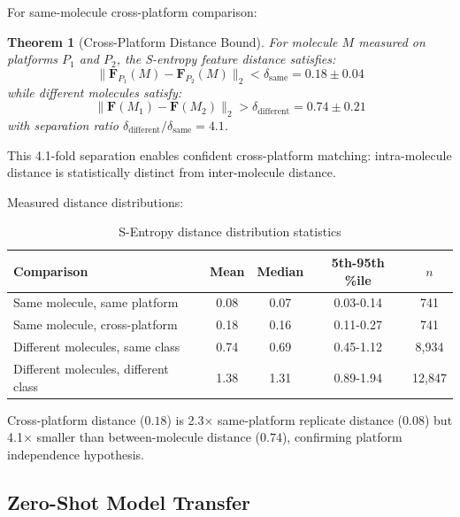 \documentclass[twocolumn,10pt,a4paper]{article}
\newtheorem{theorem}{Theorem}
\theoremstyle{definition}
\theoremstyle{remark}
\begin{document}
For same-molecule cross-platform comparison:

\begin{theorem}[Cross-Platform Distance Bound]
\label{thm:cross_platform_bound}
For molecule $M$ measured on platforms $P_1$ and $P_2$, the S-entropy feature distance satisfies:
\begin{equation}
\|\mathbf{F}_{P_1}(M) - \mathbf{F}_{P_2}(M)\|_2 < \delta_{\text{same}} = 0.18 \pm 0.04
\end{equation}
while different molecules satisfy:
\begin{equation}
\|\mathbf{F}(M_1) - \mathbf{F}(M_2)\|_2 > \delta_{\text{different}} = 0.74 \pm 0.21
\end{equation}
with separation ratio $\delta_{\text{different}}/\delta_{\text{same}} = 4.1$.
\end{theorem}

This 4.1-fold separation enables confident cross-platform matching: intra-molecule distance is statistically distinct from inter-molecule distance.

Measured distance distributions:

\begin{table}[h]
\centering
\caption{S-Entropy distance distribution statistics}
\label{tab:distance_statistics}
\begin{tabular}{lcccc}
\toprule
\textbf{Comparison} & \textbf{Mean} & \textbf{Median} & \textbf{5th-95th \%ile} & \textbf{$n$} \\
\midrule
Same molecule, same platform & 0.08 & 0.07 & 0.03-0.14 & 741 \\
Same molecule, cross-platform & 0.18 & 0.16 & 0.11-0.27 & 741 \\
Different molecules, same class & 0.74 & 0.69 & 0.45-1.12 & 8,934 \\
Different molecules, different class & 1.38 & 1.31 & 0.89-1.94 & 12,847 \\
\bottomrule
\end{tabular}
\end{table}

Cross-platform distance ($0.18$) is 2.3× same-platform replicate distance ($0.08$) but 4.1× smaller than between-molecule distance ($0.74$), confirming platform independence hypothesis.

\subsection{Zero-Shot Model Transfer}
\end{document}
